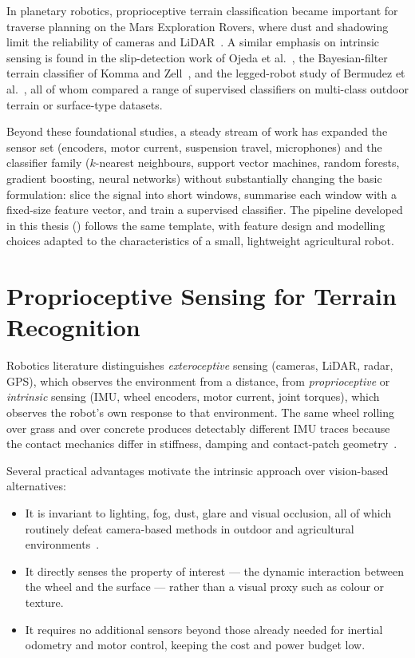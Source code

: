 In planetary robotics, proprioceptive terrain classification became important for traverse planning on the Mars Exploration Rovers, where dust and shadowing limit the reliability of cameras and LiDAR~\cite{Weiss2011,Otsu2016}. A similar emphasis on intrinsic sensing is found in the slip-detection work of Ojeda et al.~\cite{Ojeda2006}, the Bayesian-filter terrain classifier of Komma and Zell~\cite{Komma2009}, and the legged-robot study of Bermudez et al.~\cite{Bermudez2012}, all of whom compared a range of supervised classifiers on multi-class outdoor terrain or surface-type datasets.

Beyond these foundational studies, a steady stream of work has expanded the sensor set (encoders, motor current, suspension travel, microphones) and the classifier family ($k$-nearest neighbours, support vector machines, random forests, gradient boosting, neural networks) without substantially changing the basic formulation: slice the signal into short windows, summarise each window with a fixed-size feature vector, and train a supervised classifier. The pipeline developed in this thesis () follows the same template, with feature design and modelling choices adapted to the characteristics of a small, lightweight agricultural robot.

\section{Proprioceptive Sensing for Terrain Recognition}
\label{sec:bg-proprio}

Robotics literature distinguishes \emph{exteroceptive} sensing (cameras, LiDAR, radar, GPS), which observes the environment from a distance, from \emph{proprioceptive} or \emph{intrinsic} sensing (IMU, wheel encoders, motor current, joint torques), which observes the robot's own response to that environment. The same wheel rolling over grass and over concrete produces detectably different IMU traces because the contact mechanics differ in stiffness, damping and contact-patch geometry~\cite{Iagnemma2004,Brooks2005}.

Several practical advantages motivate the intrinsic approach over vision-based alternatives:
\begin{itemize}
    \item It is invariant to lighting, fog, dust, glare and visual occlusion, all of which routinely defeat camera-based methods in outdoor and agricultural environments~\cite{Reina2016}.
    \item It directly senses the property of interest --- the dynamic interaction between the wheel and the surface --- rather than a visual proxy such as colour or texture.
    \item It requires no additional sensors beyond those already needed for inertial odometry and motor control, keeping the cost and power budget low.
\end{itemize}

